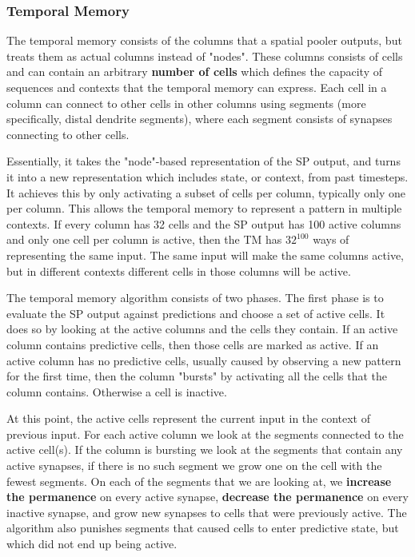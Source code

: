 \subsubsection{Temporal Memory}
The temporal memory consists of the columns that a spatial pooler outputs, but treats them as actual columns instead of "nodes". These columns consists of cells and can contain an arbitrary \textbf{number of cells} which defines the capacity of sequences and contexts that the temporal memory can express. Each cell in a column can connect to other cells in other columns using segments (more specifically, distal dendrite segments), where each segment consists of synapses connecting to other cells.
\par
Essentially, it takes the "node"-based representation of the SP output, and turns it into a new representation which includes state, or context, from past timesteps. It achieves this by only activating a subset of cells per column, typically only one per column. This allows the temporal memory to represent a pattern in multiple contexts. If every column has 32 cells and the SP output has 100 active columns and only one cell per column is active, then the TM has $32^{100}$ ways of representing the same input. The same input will make the same columns active, but in different contexts different cells in those columns will be active.
\par
The temporal memory algorithm consists of two phases. The first phase is to evaluate the SP output against predictions and choose a set of active cells. It does so by looking at the active columns and the cells they contain. If an active column contains predictive cells, then those cells are marked as active. If an active column has no predictive cells, usually caused by observing a new pattern for the first time, then the column "bursts" by activating all the cells that the column contains. Otherwise a cell is inactive.
\par
At this point, the active cells represent the current input in the context of previous input. For each active column we look at the segments connected to the active cell(s). If the column is bursting we look at the segments that contain any active synapses, if there is no such segment we grow one on the cell with the fewest segments. On each of the segments that we are looking at, we \textbf{increase the permanence} on every active synapse, \textbf{decrease the permanence} on every inactive synapse, and grow new synapses to cells that were previously active. The algorithm also punishes segments that caused cells to enter predictive state, but which did not end up being active.
